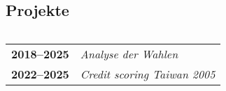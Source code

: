 \documentclass[grey]{hipstercv}
\begin{document}
\begin{paracol}{2}
\begin{minipage}[t]{0.3\textwidth}
\end{minipage}\hfill
\begin{minipage}[t]{0.3\textwidth}
\section*{Projekte}

\begin{tabular}{r| p{} c}
\end{tabular}

\begin{tabular}{>{\footnotesize\bfseries}r >{\footnotesize}p{}}
    2018--2025&\emph{Analyse der Wahlen} \\
    2022--2025&\emph{Credit scoring Taiwan 2005}
\end{tabular}



\end{minipage}










\end{paracol}
\end{document}

